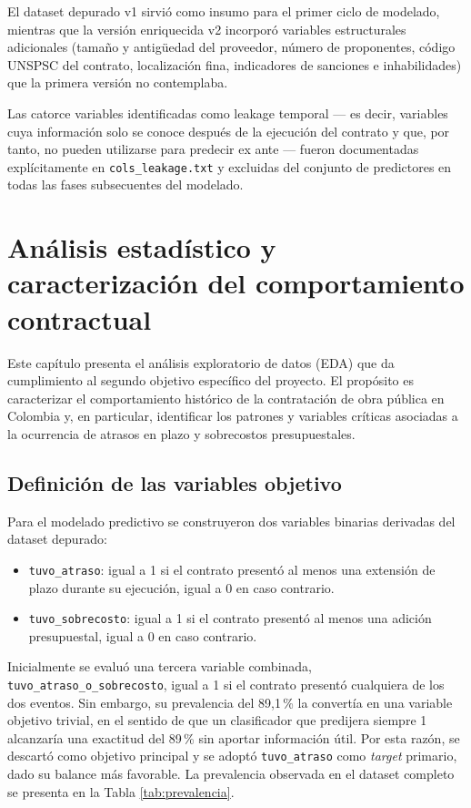 \documentclass[12pt,letterpaper,oneside]{report}
\begin{document}
El dataset depurado v1 sirvió como insumo para el primer ciclo de modelado,
mientras que la versión enriquecida v2 incorporó variables estructurales
adicionales (tamaño y antigüedad del proveedor, número de proponentes, código
UNSPSC del contrato, localización fina, indicadores de sanciones e
inhabilidades) que la primera versión no contemplaba.

Las catorce variables identificadas como leakage temporal --- es decir,
variables cuya información solo se conoce después de la ejecución del contrato
y que, por tanto, no pueden utilizarse para predecir ex ante --- fueron
documentadas explícitamente en \texttt{cols\_leakage.txt} y excluidas del
conjunto de predictores en todas las fases subsecuentes del modelado.

\chapter{Análisis estadístico y caracterización del comportamiento contractual}
\label{cap:analisis}

Este capítulo presenta el análisis exploratorio de datos (EDA) que da
cumplimiento al segundo objetivo específico del proyecto. El propósito es
caracterizar el comportamiento histórico de la contratación de obra pública en
Colombia y, en particular, identificar los patrones y variables críticas
asociadas a la ocurrencia de atrasos en plazo y sobrecostos presupuestales.

\section{Definición de las variables objetivo}

Para el modelado predictivo se construyeron dos variables binarias derivadas
del dataset depurado:

\begin{itemize}
    \item \texttt{tuvo\_atraso}: igual a 1 si el contrato presentó al menos
    una extensión de plazo durante su ejecución, igual a 0 en caso contrario.
    \item \texttt{tuvo\_sobrecosto}: igual a 1 si el contrato presentó al menos
    una adición presupuestal, igual a 0 en caso contrario.
\end{itemize}

Inicialmente se evaluó una tercera variable combinada,
\texttt{tuvo\_atraso\_o\_sobrecosto}, igual a 1 si el contrato presentó
cualquiera de los dos eventos. Sin embargo, su prevalencia del 89,1\,\% la
convertía en una variable objetivo trivial, en el sentido de que un
clasificador que predijera siempre 1 alcanzaría una exactitud del 89\,\% sin
aportar información útil. Por esta razón, se descartó como objetivo principal y
se adoptó \texttt{tuvo\_atraso} como \emph{target} primario, dado su balance
más favorable. La prevalencia observada en el dataset completo se presenta en
la Tabla \ref{tab:prevalencia}.
\end{document}
